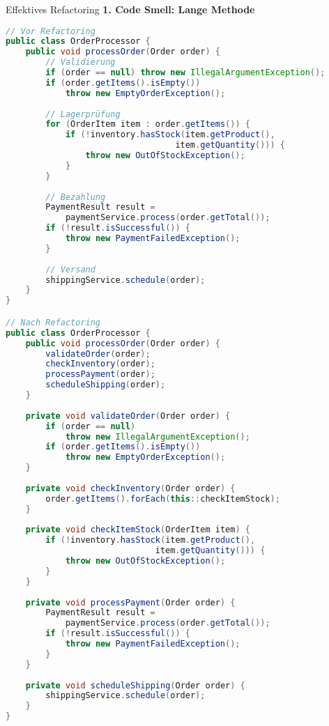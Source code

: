 \begin{KR}{Effektives Refactoring}
\textbf{1. Code Smell: Lange Methode}
\begin{lstlisting}[language=Java]
// Vor Refactoring
public class OrderProcessor {
    public void processOrder(Order order) {
        // Validierung
        if (order == null) throw new IllegalArgumentException();
        if (order.getItems().isEmpty()) 
            throw new EmptyOrderException();
        
        // Lagerprüfung
        for (OrderItem item : order.getItems()) {
            if (!inventory.hasStock(item.getProduct(), 
                                  item.getQuantity())) {
                throw new OutOfStockException();
            }
        }
        
        // Bezahlung
        PaymentResult result = 
            paymentService.process(order.getTotal());
        if (!result.isSuccessful()) {
            throw new PaymentFailedException();
        }
        
        // Versand
        shippingService.schedule(order);
    }
}

// Nach Refactoring
public class OrderProcessor {
    public void processOrder(Order order) {
        validateOrder(order);
        checkInventory(order);
        processPayment(order);
        scheduleShipping(order);
    }
    
    private void validateOrder(Order order) {
        if (order == null) 
            throw new IllegalArgumentException();
        if (order.getItems().isEmpty()) 
            throw new EmptyOrderException();
    }
    
    private void checkInventory(Order order) {
        order.getItems().forEach(this::checkItemStock);
    }
    
    private void checkItemStock(OrderItem item) {
        if (!inventory.hasStock(item.getProduct(), 
                              item.getQuantity())) {
            throw new OutOfStockException();
        }
    }
    
    private void processPayment(Order order) {
        PaymentResult result = 
            paymentService.process(order.getTotal());
        if (!result.isSuccessful()) {
            throw new PaymentFailedException();
        }
    }
    
    private void scheduleShipping(Order order) {
        shippingService.schedule(order);
    }
}
\end{lstlisting}
\end{KR}

